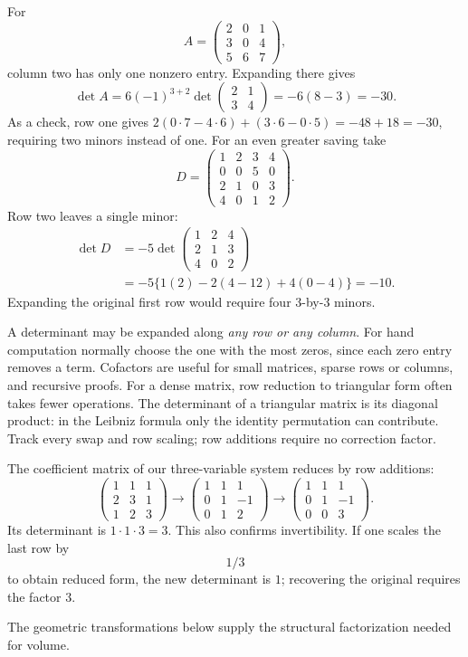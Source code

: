\begin{example}
For
\[
A=\begin{pmatrix}2&0&1\\3&0&4\\5&6&7\end{pmatrix},
\]
column two has only one nonzero entry. Expanding there gives
\[
\det A=6(-1)^{3+2}\det\begin{pmatrix}2&1\\3&4\end{pmatrix}
=-6(8-3)=-30.
\]
As a check, row one gives
$2(0\cdot7-4\cdot6)+(3\cdot6-0\cdot5)=-48+18=-30$,
requiring two minors instead of one.
For an even greater saving take
\[
D=\begin{pmatrix}1&2&3&4\\0&0&5&0\\2&1&0&3\\4&0&1&2\end{pmatrix}.
\]
Row two leaves a single minor:
\[
\begin{aligned}
\det D&=-5\det\begin{pmatrix}1&2&4\\2&1&3\\4&0&2\end{pmatrix}\\
&=-5\{1(2)-2(4-12)+4(0-4)\}=-10.
\end{aligned}
\]
Expanding the original first row would require four $3$-by-$3$ minors.
\end{example}
A determinant may be expanded along \emph{any row or any column}.
For hand computation normally choose the one with the most zeros, since
each zero entry removes a term. Cofactors are useful for small matrices,
sparse rows or columns, and recursive proofs. For a dense matrix, row
reduction to triangular form often takes fewer operations. The determinant
of a triangular matrix is its diagonal product: in the Leibniz formula
only the identity permutation can contribute. Track every swap and row
scaling; row additions require no correction factor.
\begin{example}
The coefficient matrix of our three-variable system reduces by row additions:
\[
\begin{pmatrix}1&1&1\\2&3&1\\1&2&3\end{pmatrix}
\longrightarrow\begin{pmatrix}1&1&1\\0&1&-1\\0&1&2\end{pmatrix}
\longrightarrow\begin{pmatrix}1&1&1\\0&1&-1\\0&0&3\end{pmatrix}.
\]
Its determinant is $1\cdot1\cdot3=3$. This also confirms invertibility.
If one scales the last row by
\[
1/3
\]
 to obtain reduced form, the new
determinant is $1$; recovering the original requires the factor $3$.
\end{example}
The geometric transformations below supply the structural factorization
needed for volume.

